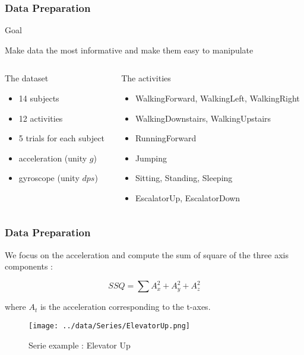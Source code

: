 \documentclass[11pt, sans, handout]{beamer}
\begin{document}
\begin{frame}
	\frametitle{Data Preparation} 
	
	 \begin{alertblock}{Goal}

		Make data the most informative and make them easy to manipulate

	\end{alertblock}
	
	\begin{columns}
	
	\begin{column}{0.5\textwidth}
		\begin{block}{The dataset}

		\begin{itemize}
			\item 14 subjects
			\item 12 activities
			\item 5 trials for each subject
			\item acceleration (unity $g$)
			\item gyroscope (unity $dps$)
		\end{itemize}

		\end{block}
	\end{column}
	
	\begin{column}{0.5\textwidth}
		\begin{block}{The activities}
		
		\begin{itemize}
			\item WalkingForward, WalkingLeft, WalkingRight
			\item WalkingDownstairs, WalkingUpstairs
			\item RunningForward
			\item Jumping
			\item Sitting, Standing, Sleeping
			\item EscalatorUp, EscalatorDown
		\end{itemize}
		
		\end{block}
	\end{column}
	
	\end{columns}
	
\end{frame}

\begin{frame}
\frametitle{Data Preparation}

	We focus on the acceleration and compute the sum of square of the three axis components :
	
	\[ SSQ = \sum A_x^2 + A_y^2 + A_z^2 \]
	
	where $A_t$ is the acceleration corresponding to the t-axes.
	
	\begin{figure}[H]
		\centering
		\texttt{[image: ../data/Series/ElevatorUp.png]}
		\caption{Serie example : Elevator Up}
		\label{ElevatorUp}
	\end{figure}
	
\end{frame}
\end{document}
